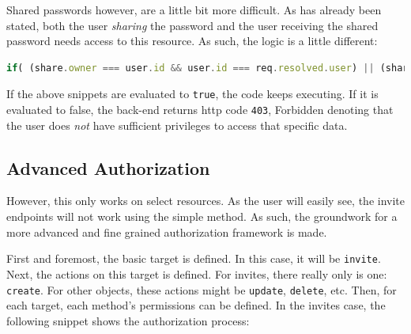 			Shared passwords however, are a little bit more difficult. As has already been stated, both the user \emph{sharing} the password and the user receiving the shared password needs access to this resource. As such, the logic is a little different:
			\begin{lstlisting}[gobble=16,language=JavaScript]
                if( (share.owner === user.id && user.id === req.resolved.user) || (share.origin_owner === user.id && user.id === req.resolved.user)){
			\end{lstlisting}
		
			If the above snippets are evaluated to \verb=true=, the code keeps executing. If it is evaluated to false, the back-end returns http code \verb=403=, Forbidden denoting that the user does \emph{not} have sufficient privileges to access that specific data.

		\subsection{Advanced Authorization}
			However, this only works on select resources. As the user will easily see, the invite endpoints will not work using the simple method. As such, the groundwork for a more advanced and fine grained authorization framework is made.

			First and foremost, the basic target is defined. In this case, it will be \verb=invite=. Next, the actions on this target is defined. For invites, there really only is one: \verb=create=. For other objects, these actions might be \verb=update=, \verb=delete=, etc. Then, for each target, each method's permissions can be defined. In the invites case, the following snippet shows the authorization process:

